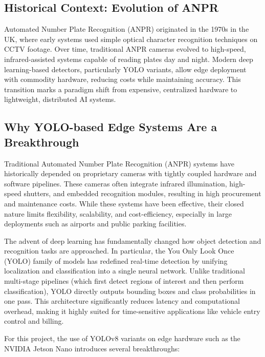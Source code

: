	
	\subsection{Historical Context: Evolution of ANPR}
	Automated Number Plate Recognition (ANPR) originated in the 1970s in the UK, where early systems used simple optical character recognition techniques on CCTV footage. Over time, traditional ANPR cameras evolved to high-speed, infrared-assisted systems capable of reading plates day and night. Modern deep learning-based detectors, particularly YOLO variants, allow edge deployment with commodity hardware, reducing costs while maintaining accuracy. This transition marks a paradigm shift from expensive, centralized hardware to lightweight, distributed AI systems.
	
	\subsection{Why YOLO-based Edge Systems Are a Breakthrough}
	Traditional Automated Number Plate Recognition (ANPR) systems have historically depended on proprietary cameras with tightly coupled hardware and software pipelines. These cameras often integrate infrared illumination, high-speed shutters, and embedded recognition modules, resulting in high procurement and maintenance costs. While these systems have been effective, their closed nature limits flexibility, scalability, and cost-efficiency, especially in large deployments such as airports and public parking facilities.
	
	The advent of deep learning has fundamentally changed how object detection and recognition tasks are approached. In particular, the You Only Look Once (YOLO) family of models has redefined real-time detection by unifying localization and classification into a single neural network. Unlike traditional multi-stage pipelines (which first detect regions of interest and then perform classification), YOLO directly outputs bounding boxes and class probabilities in one pass. This architecture significantly reduces latency and computational overhead, making it highly suited for time-sensitive applications like vehicle entry control and billing.
	
	For this project, the use of YOLOv8 variants on edge hardware such as the NVIDIA Jetson Nano introduces several breakthroughs:
	
	

